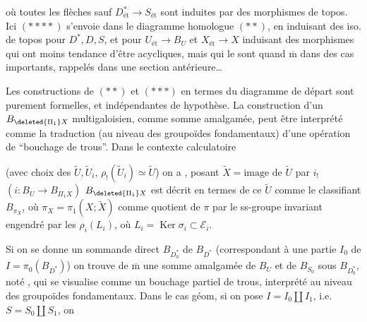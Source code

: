 où toutes les flèches sauf $D^*_{\text{ét}}\longrightarrow S_{\text{ét}}$ sont induites par des morphismes de topos.
Ici $(****)$ s'envoie dans le diagramme homologue $(**)$, en induisant des iso. de topos pour $D^*,D,S$, et pour $U_{\text{ét}}\longrightarrow B_U$ et $X_{\text{ét}}\longrightarrow X$ induisant des morphismes qui ont moins tendance d'être acycliques, mais qui le sont  quand $\overline{\mathrm m}$ dans des cas importants, rappelés dans une section antérieure\ldots

Les constructions de $(**)$ et $(***)$ en termes du diagramme de départ
sont purement formelles, et indépendantes de  hypothèse.
La construction d'un $B_{\deleted{\Pi_1}X}$ multigaloisien, comme somme amalgamée, peut être interprété comme la traduction (au niveau des groupoïdes fondamentaux) d'une opération de ``bouchage de trous''.
 Dans le contexte calculatoire


(avec choix des $\widetilde U,\widetilde U_i$, $\rho_!(\widetilde U_i)\simeq\widetilde U$) on a
,
posant $\widetilde X=\text{image de }\widetilde U$ par $i_!$ $(i:B_U\longrightarrow B_{\Pi_1 X})$ $B_{\deleted{\Pi_1}X}$ est décrit en termes de ce $\widetilde U$ comme le  classifiant $B_{\pi_X}$, où $\pi_X=\pi_1(X;\widetilde X)$   comme quotient de $\pi$ par le ss-groupe invariant engendré par les $\rho_i(L_i)$, où $L_i=\operatorname{Ker}\sigma_i\subset\mathcal E_i$.

Si on se donne un sommande direct $B_{D_0^*}$ de $B_{D^*}$ (correspondant à une partie $I_0$ de $I=\pi_0(B_{D^*})$) on trouve de $\overline{\mathrm m}$ une somme amalgamée de $B_U$ et de $B_{S_0}$ sous $B_{D_0^*}$, noté  , qui se visualise comme un bouchage partiel de trous, interprété au niveau des groupoïdes fondamentaux. Dans le cas géom, si on pose $I=I_0\amalg I_1$, i.e. $S=S_0\amalg S_1$, on



